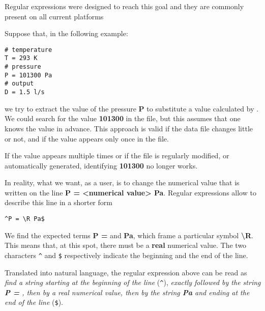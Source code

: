 Regular expressions were designed to reach this goal and they are commonly present on all current platforms%

Suppose that, in the following example:
\lstset{language=C++, basicstyle=\normalsize}
\begin{lstlisting}[frame=TBRL]
# temperature
T = 293 K
# pressure
P = 101300 Pa
# output
D = 1.5 l/s
\end{lstlisting}

we try to extract the value of the pressure {\bf P} to substitute a value calculated by \OT. We could search for the value {\bf 101300} in the file, but this assumes that one knows the value in advance. This approach is valid if the data file changes little or not, and if the value appears only once in the file.

If the value appears multiple times or if the file is regularly modified, or automatically generated, identifying {\bf 101300} no longer works.

In reality, what we want, as a user, is to change the numerical value that is written on the line {\bf P = <numerical value> Pa}. Regular expressions allow to describe this line in a shorter form%
\lstset{language=C++, basicstyle=\normalsize}
\begin{lstlisting}[frame=TBRL]
^P = \R Pa$
\end{lstlisting}

We find the expected terms {\bf P =} and {\bf Pa}, which frame a particular symbol {\bf \textbackslash R}. This means that, at this spot, there must be a {\bf real} numerical value. The two characters \verb+^+ and \verb+$+ respectively indicate the beginning and the end of the line.

Translated into natural language, the regular expression above can be read as \emph{find a string starting at the beginning of the line} (\verb+^+), \emph{exactly followed by the string {\bf P = }, then by a real numerical value, then by the string {\bf Pa} and ending at the end of the line} (\verb+$+).

